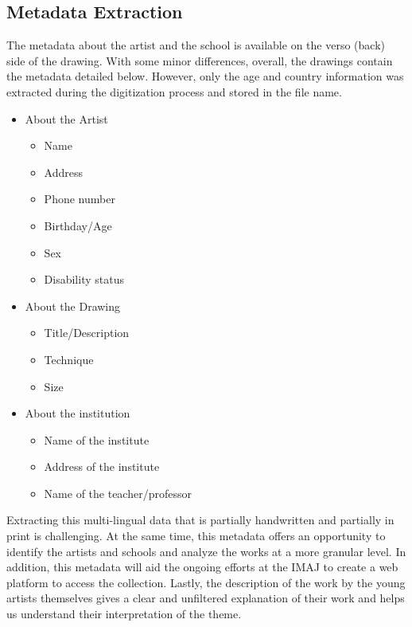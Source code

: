 \subsection{Metadata Extraction}
The metadata about the artist and the school is available on the verso (back) side of the drawing. With some minor differences, overall, the drawings contain the metadata detailed below. However, only the age and country information was extracted during the digitization process and stored in the file name. 
\begin{itemize}
	\item About the Artist
		\begin{itemize}
			\item Name
			\item Address
			\item Phone number
			\item Birthday/Age
			\item Sex
			\item Disability status
		\end{itemize}
	\item About the Drawing
		\begin{itemize}
			\item Title/Description
			\item Technique
			\item Size
		\end{itemize}
	\item About the institution
		\begin{itemize}
			\item Name of the institute
			\item Address of the institute
			\item Name of the teacher/professor
		\end{itemize}
\end{itemize}
Extracting this multi-lingual data that is partially handwritten and partially in print is challenging. At the same time, this metadata offers an opportunity to identify the artists and schools and analyze the works at a more granular level. In addition, this metadata will aid the ongoing efforts at the IMAJ to create a web platform to access the collection. Lastly, the description of the work by the young artists themselves gives a clear and unfiltered explanation of their work and helps us understand their interpretation of the theme.

